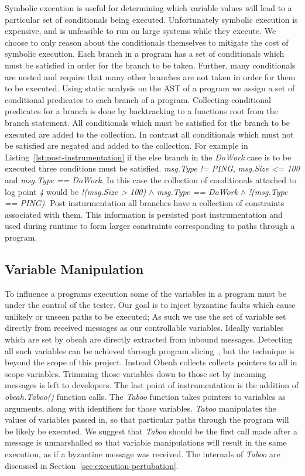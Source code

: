 Symbolic execution is useful for determining which variable values will lead to
a particular set of conditionals being executed. Unfortunately symbolic
execution is expensive, and is unfeasible to run on large systems while they
execute. We choose to only reason about the conditionals themselves to
mitigate the cost of symbolic execution. Each branch in a program has a set of
conditionals which must be satisfied in order for the branch to be taken.
Further, many conditionals are nested and require that many other branches are
not taken in order for them to be executed. Using static analysis on the AST of
a program we assign a set of conditional predicates to each branch of a
program. Collecting conditional predicates for a branch is done by backtracking
to a functions root from the branch statement. All conditionals which must be
satisfied for the branch to be executed are added to the collection. In
contrast all conditionals which must not be satisfied are negated and added to
the collection. For example in Listing~\ref{lst:post-instrumentation} if the
else branch in the \emph{DoWork} case is to be executed three conditions must
be satisfied. \emph{msg.Type != PING}, \emph{msg.Size <= 100} and
\emph{msg.Type == DoWork}. In this case the collection of conditionals attached
to log point \emph{4} would be \emph{!(msg.Size > 100)} $\wedge$ \emph{msg.Type
== DoWork} $\wedge$ \emph{!(msg.Type == PING)}. Post insturmentation all
branches have a collection of constraints associated with them. This information
is persisted post instrumentation and used during runtime to form larger
constraints corresponding to paths through a program.

\subsection{Variable Manipulation}

To influence a programs execution some of the variables in a program must be
under the control of the tester. Our goal is to inject byzantine faults which
cause unlikely or unseen paths to be executed; As such we use the set of
variable set directly from received messages as our controllable variables.
Ideally variables which are set by obeah are directly extracted from inbound
messages. Detecting all such variables can be achieved through program
slicing~\cite{Ottenstein:1984}, but the technique is beyond the scope of this
project. Instead Obeah collects collects pointers to all in scope variables.
Trimming those variables down to those set by incoming messages is left to
developers. The last point of instrumentation is the addition of
\emph{obeah.Taboo()} function calls. The \emph{Taboo} function takes pointers
to variables as arguments, along with identifiers for those variables.
\emph{Taboo} manipulates the values of variables passed in, so that particular
paths through the program will be likely be executed. We suggest that
\emph{Taboo} should be the first call made after a message is unmarshalled so
that variable manipulations will result in the same execution, as if a byzantine
message was received. The internals of \emph{Taboo} are discussed in
Section~\ref{sec:execution-pertubation}.


